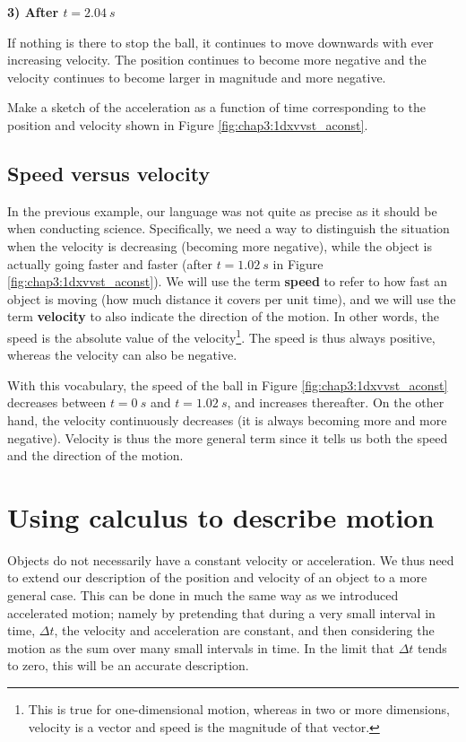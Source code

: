 \textbf{3) After $t=\SI{2.04}{s}$}

If nothing is there to stop the ball, it continues to move downwards with ever increasing velocity. The position continues to become more negative and the velocity continues to become larger in magnitude and more negative.

\begin{checkpointSA}{Make a sketch of the acceleration as a function of time corresponding to the position and velocity shown in Figure \ref{fig:chap3:1dxvvst_aconst}.}
\end{checkpointSA}

\subsection{Speed versus velocity}
In the previous example, our language was not quite as precise as it should be when conducting science. Specifically, we need a way to distinguish the situation when the velocity is decreasing (becoming more negative), while the object is actually going faster and faster (after $t=\SI{1.02}{s}$ in Figure \ref{fig:chap3:1dxvvst_aconst}). We will use the term \textbf{speed} to refer to how fast an object is moving (how much distance it covers per unit time), and we will use the term \textbf{velocity} to also indicate the direction of the motion. In other words, the speed is the absolute value of the velocity\footnote{This is true for one-dimensional motion, whereas in two or more dimensions, velocity is a vector and speed is the magnitude of that vector.}. The speed is thus always positive, whereas the velocity can also be negative.

With this vocabulary, the speed of the ball in Figure \ref{fig:chap3:1dxvvst_aconst} decreases between $t=\SI{0}{s}$ and $t=\SI{1.02}{s}$, and increases thereafter. On the other hand, the velocity continuously decreases (it is always becoming more and more negative). Velocity is thus the more general term since it tells us both the speed and the direction of the motion. 

\section{Using calculus to describe motion}
Objects do not necessarily have a constant velocity or acceleration. We thus need to extend our description of the position and velocity of an object to a more general case. This can be done in much the same way as we introduced accelerated motion; namely by pretending that during a very small interval in time, $\Delta t$, the velocity and acceleration are constant, and then considering the motion as the sum over many small intervals in time. In the limit that $\Delta t$ tends to zero, this will be an accurate description. 

